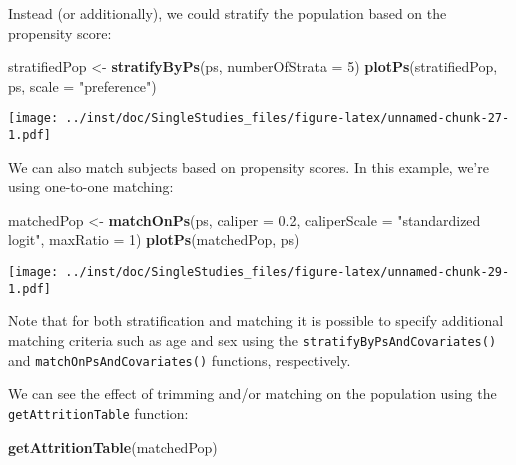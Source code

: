 \documentclass[]{article}
\newenvironment{Shaded}{\begin{snugshade}}{\end{snugshade}}
\newcommand{\DataTypeTok}[1]{\textcolor[rgb]{0.13,0.29,0.53}{#1}}
\newcommand{\DecValTok}[1]{\textcolor[rgb]{0.00,0.00,0.81}{#1}}
\newcommand{\FloatTok}[1]{\textcolor[rgb]{0.00,0.00,0.81}{#1}}
\newcommand{\KeywordTok}[1]{\textcolor[rgb]{0.13,0.29,0.53}{\textbf{#1}}}
\newcommand{\NormalTok}[1]{#1}
\newcommand{\StringTok}[1]{\textcolor[rgb]{0.31,0.60,0.02}{#1}}
\begin{document}
Instead (or additionally), we could stratify the population based on the
propensity score:

\begin{Shaded}
\begin{Highlighting}[]
\NormalTok{stratifiedPop <-}\StringTok{ }\KeywordTok{stratifyByPs}\NormalTok{(ps, }\DataTypeTok{numberOfStrata =} \DecValTok{5}\NormalTok{)}
\KeywordTok{plotPs}\NormalTok{(stratifiedPop, ps, }\DataTypeTok{scale =} \StringTok{"preference"}\NormalTok{)}
\end{Highlighting}
\end{Shaded}

\texttt{[image: ../inst/doc/SingleStudies\_files/figure-latex/unnamed-chunk-27-1.pdf]}

We can also match subjects based on propensity scores. In this example,
we're using one-to-one matching:

\begin{Shaded}
\begin{Highlighting}[]
\NormalTok{matchedPop <-}\StringTok{ }\KeywordTok{matchOnPs}\NormalTok{(ps, }\DataTypeTok{caliper =} \FloatTok{0.2}\NormalTok{, }\DataTypeTok{caliperScale =} \StringTok{"standardized logit"}\NormalTok{, }\DataTypeTok{maxRatio =} \DecValTok{1}\NormalTok{)}
\KeywordTok{plotPs}\NormalTok{(matchedPop, ps)}
\end{Highlighting}
\end{Shaded}

\texttt{[image: ../inst/doc/SingleStudies\_files/figure-latex/unnamed-chunk-29-1.pdf]}

Note that for both stratification and matching it is possible to specify
additional matching criteria such as age and sex using the
\texttt{stratifyByPsAndCovariates()} and
\texttt{matchOnPsAndCovariates()} functions, respectively.

We can see the effect of trimming and/or matching on the population
using the \texttt{getAttritionTable} function:

\begin{Shaded}
\begin{Highlighting}[]
\KeywordTok{getAttritionTable}\NormalTok{(matchedPop)}
\end{Highlighting}
\end{Shaded}
\end{document}
